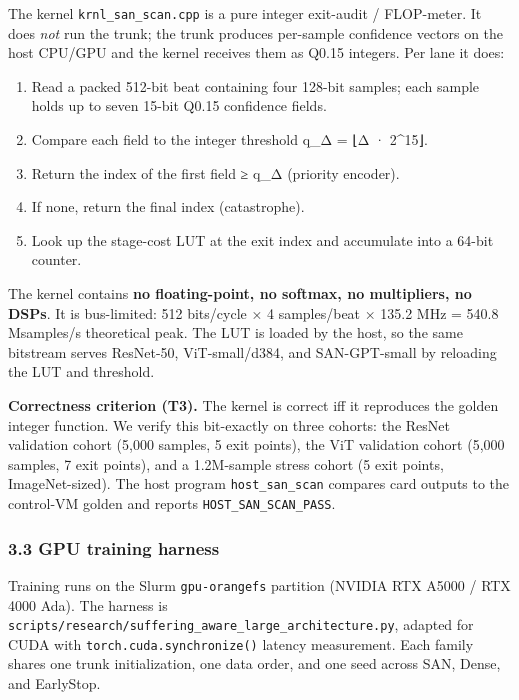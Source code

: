 \documentclass[
]{article}
\providecommand{\tightlist}{%
  \setlength{\itemsep}{0pt}\setlength{\parskip}{0pt}}
\begin{document}
The kernel \texttt{krnl\_san\_scan.cpp} is a pure integer exit-audit /
FLOP-meter. It does \emph{not} run the trunk; the trunk produces
per-sample confidence vectors on the host CPU/GPU and the kernel
receives them as Q0.15 integers. Per lane it does:

\begin{enumerate}
\def\labelenumi{\arabic{enumi}.}
\tightlist
\item
  Read a packed 512-bit beat containing four 128-bit samples; each
  sample holds up to seven 15-bit Q0.15 confidence fields.
\item
  Compare each field to the integer threshold q\_Δ = ⌊Δ · 2\^{}15⌋.
\item
  Return the index of the first field ≥ q\_Δ (priority encoder).
\item
  If none, return the final index (catastrophe).
\item
  Look up the stage-cost LUT at the exit index and accumulate into a
  64-bit counter.
\end{enumerate}

The kernel contains \textbf{no floating-point, no softmax, no
multipliers, no DSPs}. It is bus-limited: 512 bits/cycle × 4
samples/beat × 135.2 MHz = 540.8 Msamples/s theoretical peak. The LUT is
loaded by the host, so the same bitstream serves ResNet-50,
ViT-small/d384, and SAN-GPT-small by reloading the LUT and threshold.

\textbf{Correctness criterion (T3).} The kernel is correct iff it
reproduces the golden integer function. We verify this bit-exactly on
three cohorts: the ResNet validation cohort (5,000 samples, 5 exit
points), the ViT validation cohort (5,000 samples, 7 exit points), and a
1.2M-sample stress cohort (5 exit points, ImageNet-sized). The host
program \texttt{host\_san\_scan} compares card outputs to the control-VM
golden and reports \texttt{HOST\_SAN\_SCAN\_PASS}.

\hypertarget{gpu-training-harness}{%
\subsubsection{3.3 GPU training harness}\label{gpu-training-harness}}

Training runs on the Slurm \texttt{gpu-orangefs} partition (NVIDIA RTX
A5000 / RTX 4000 Ada). The harness is
\texttt{scripts/research/suffering\_aware\_large\_architecture.py},
adapted for CUDA with \texttt{torch.cuda.synchronize()} latency
measurement. Each family shares one trunk initialization, one data
order, and one seed across SAN, Dense, and EarlyStop.
\end{document}
